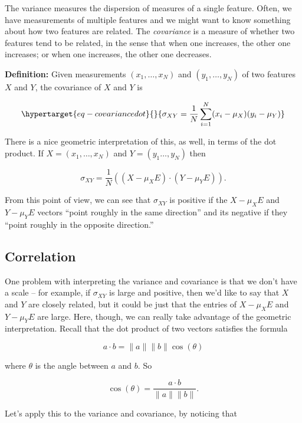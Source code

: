 \documentclass[
  11pt,
  letterpaper,
]{scrbook}
\theoremstyle{plain}
\theoremstyle{remark}
\begin{document}
The variance measures the dispersion of measures of a single feature.
Often, we have measurements of multiple features and we might want to
know something about how two features are related. The \emph{covariance}
is a measure of whether two features tend to be related, in the sense
that when one increases, the other one increases; or when one increases,
the other one decreases.

\textbf{Definition:} Given measurements \((x_1,\ldots, x_N)\) and
\((y_1,\ldots, y_N)\) of two features \(X\) and \(Y\), the covariance of
\(X\) and \(Y\) is

\begin{equation}\protect\hypertarget{eq-covariancedot}{}{
\sigma_{XY} = \frac{1}{N}\sum_{i=1}^{N} (x_i-\mu_{X})(y_i-\mu_{Y})
}\label{eq-covariancedot}\end{equation}

There is a nice geometric interpretation of this, as well, in terms of
the dot product. If \(X=(x_1,\ldots, x_N)\) and \(Y=(y_1\ldots,y_N)\)
then

\[
\sigma_{XY} = \frac{1}{N} ((X-\mu_{X}E)\cdot (Y-\mu_{Y}E)).
\]

From this point of view, we can see that \(\sigma_{XY}\) is positive if
the \(X-\mu_{X}E\) and \(Y-\mu_{Y}E\) vectors ``point roughly in the
same direction'' and its negative if they ``point roughly in the
opposite direction.''

\hypertarget{correlation}{%
\subsection{Correlation}\label{correlation}}

One problem with interpreting the variance and covariance is that we
don't have a scale -- for example, if \(\sigma_{XY}\) is large and
positive, then we'd like to say that \(X\) and \(Y\) are closely
related, but it could be just that the entries of \(X-\mu_{X}E\) and
\(Y-\mu_{Y}E\) are large. Here, though, we can really take advantage of
the geometric interpretation. Recall that the dot product of two vectors
satisfies the formula

\[
a \cdot b = \|a\|\|b\|\cos(\theta)
\]

where \(\theta\) is the angle between \(a\) and \(b\). So

\[
\cos(\theta) = \frac{a\cdot b}{\|a\|\|b\|}.
\]

Let's apply this to the variance and covariance, by noticing that
\end{document}
